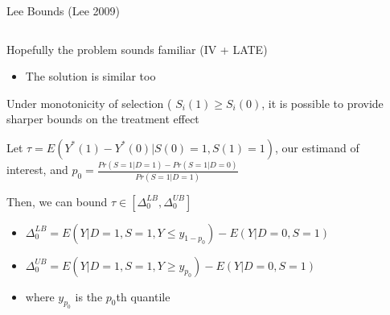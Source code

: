 \documentclass[notes,11pt, aspectratio=169]{beamer}
\newenvironment{wideitemize}{\itemize\addtolength{\itemsep}{10pt}}{\enditemize}
\begin{document}
\begin{frame}{Lee Bounds (Lee 2009)}
      \begin{columns}[onlytextwidth, T] %
        \begin{column}{.9\textwidth}
          \begin{wideitemize}
          \item Hopefully the problem sounds familiar (IV + LATE)
            \begin{itemize}
            \item The solution is similar too
            \end{itemize}
          \item Under monotonicity of selection (
            $S_{i}(1) \geq S_{i}(0)$, it is possible to provide sharper
            bounds on the treatment effect
          \item Let $\tau = E(Y^{*}(1) - Y^{*}(0) | S(0) = 1, S(1) = 1)$, our estimand of interest, and $p_{0} = \frac{Pr(S = 1 | D = 1) - Pr(S = 1| D = 0)}{Pr(S = 1 | D = 1)}$ 
          \item Then, we can bound $\tau \in [\Delta_{0}^{LB}, \Delta_{0}^{UB}]$
            \begin{itemize}
            \item $\Delta_{0}^{LB} = E(Y | D = 1, S = 1, Y \leq y_{1-p_{0}}) - E(Y | D = 0, S = 1)$
            \item $\Delta_{0}^{UB} = E(Y | D = 1, S = 1, Y \geq y_{p_{0}}) - E(Y | D = 0, S = 1)$
            \item where $y_{p_{0}}$ is the $p_{0}$th quantile
            \end{itemize}
          \end{wideitemize}
      \end{column}%
      \hfill%
      \begin{column}{.5\textwidth}

      \end{column}%
    \end{columns}
\end{frame}
\end{document}
